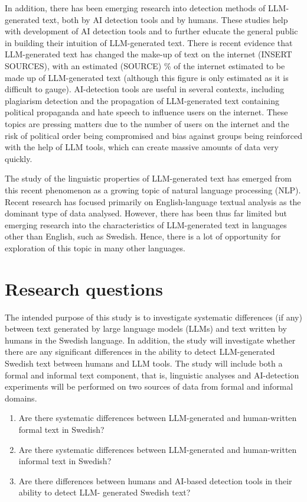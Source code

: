 \documentclass[thesis]{cluu}
\begin{document}
In addition, there has been emerging research into detection
methods of LLM-generated text, both by AI detection tools and by
humans. These studies help with development of AI detection
tools and to further educate the general public in building
their intuition of LLM-generated text. There is recent evidence
that LLM-generated text has changed the make-up of text on the
internet (INSERT SOURCES), with an estimated (SOURCE) \% of the
internet estimated to be made up of LLM-generated text (although
this figure is only estimated as it is difficult to gauge).
AI-detection tools are useful in several contexts, including
plagiarism detection and the propagation of LLM-generated text
containing political propaganda and hate speech to influence
users on the internet. These topics are pressing matters due to
the number of users on the internet and the risk of political
order being compromised and bias against groups being reinforced
with the help of LLM tools, which can create massive amounts of
data very quickly.

The study of the linguistic properties of LLM-generated text has
emerged from this recent phenomenon as a growing topic of
natural language processing (NLP). Recent research has focused
primarily on English-language textual analysis as the dominant
type of data analysed. However, there has been thus far limited
but emerging research into the characteristics of LLM-generated
text in languages other than English, such as Swedish. Hence,
there is a lot of opportunity for exploration of this topic in
many other languages.



\section{Research questions}

The intended purpose of this study is to investigate systematic
differences (if any) between text generated
by large language models (LLMs) and text written by humans in
the Swedish language. In addition, the
study will investigate whether there are any significant
differences in the ability to detect LLM-generated
Swedish text between humans and LLM tools. The study will
include both a formal and informal text
component, that is, linguistic analyses and AI-detection
experiments will be performed on two sources
of data from formal and informal domains.

\begin{enumerate}
\item Are there systematic differences between LLM-generated and
human-written formal text in
Swedish?
\item Are there systematic differences between LLM-generated and
human-written informal text in
Swedish?
\item Are there differences between humans and AI-based
detection tools in their ability to detect LLM-
generated Swedish text?
\end{enumerate}
\end{document}
